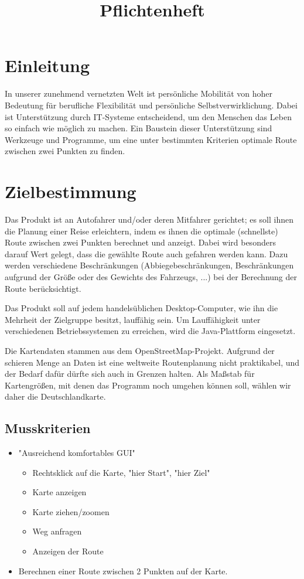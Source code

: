 \documentclass[a4paper, 11pt]{article}
\title{Pflichtenheft}
\begin{document}

\maketitle
\newpage
\tableofcontents
\newpage


\section{Einleitung}
In unserer zunehmend vernetzten Welt ist persönliche Mobilität von hoher Bedeutung für berufliche Flexibilität und persönliche Selbstverwirklichung. Dabei ist Unterstützung durch IT-Systeme entscheidend, um den Menschen das Leben so einfach wie möglich zu machen. Ein Baustein dieser Unterstützung sind Werkzeuge und Programme, um eine unter bestimmten Kriterien optimale Route zwischen zwei Punkten zu finden.

\section{Zielbestimmung}
Das Produkt ist an Autofahrer und/oder deren Mitfahrer gerichtet; es soll ihnen die Planung einer Reise erleichtern, indem es ihnen die optimale (schnellste) Route zwischen zwei Punkten berechnet und anzeigt.
Dabei wird besonders darauf Wert gelegt, dass die gewählte Route auch gefahren werden kann. Dazu werden verschiedene Beschränkungen (Abbiegebeschränkungen, Beschränkungen aufgrund der Größe oder des Gewichts des Fahrzeugs, ...) bei der Berechnung der Route berücksichtigt.

Das Produkt soll auf jedem handelsüblichen Desktop-Computer, wie ihn die Mehrheit der Zielgruppe besitzt, lauffähig sein. Um Lauffähigkeit unter verschiedenen Betriebssystemen zu erreichen, wird die Java-Plattform eingesetzt.

Die Kartendaten stammen aus dem OpenStreetMap-Projekt. Aufgrund der schieren Menge an Daten ist eine weltweite Routenplanung nicht praktikabel, und der Bedarf dafür dürfte sich auch in Grenzen halten. Als Maßstab für Kartengrößen, mit denen das Programm noch umgehen können soll, wählen wir daher die Deutschlandkarte.

\subsection{Musskriterien}
\begin{itemize}
\item "Ausreichend komfortables GUI"
\begin{itemize}
\item Rechtsklick auf die Karte, "hier Start", "hier Ziel"
\item Karte anzeigen
\item Karte ziehen/zoomen
\item Weg anfragen
\item Anzeigen der Route
\end{itemize}
\item Berechnen einer Route zwischen 2 Punkten auf der Karte.
\end{itemize}
\end{document}
